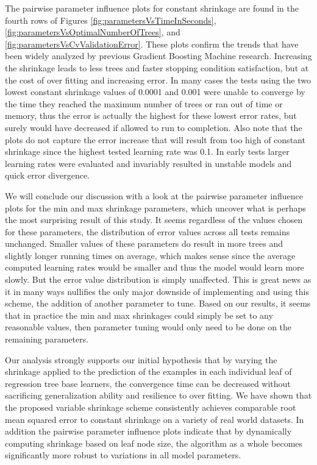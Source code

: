 \documentclass[9pt, conference]{IEEEtran}
\begin{document}
The pairwise parameter influence plots for constant shrinkage are found in the fourth rows of Figures \ref{fig:parametersVsTimeInSeconds},
\ref{fig:parametersVsOptimalNumberOfTrees}, and
\ref{fig:parametersVsCvValidationError}. These plots confirm the trends that have been widely analyzed by previous Gradient Boosting Machine research. Increasing the shrinkage leads to less trees and faster stopping condition satisfaction, but at the cost of over fitting and increasing error. In many cases the tests using the two lowest constant shrinkage values of 0.0001 and 0.001 were unable to converge by the time they reached the maximum number of trees or ran out of time or memory, thus the error is actually the highest for these lowest error rates, but surely would have decreased if allowed to run to completion. Also note that the plots do not capture the error increase that will result from too high of constant shrinkage since the highest tested learning rate was 0.1. In early tests larger learning rates were evaluated and invariably resulted in unstable models and quick error divergence.

We will conclude our discussion with a look at the pairwise parameter influence plots for the min and max shrinkage parameters, which uncover what is perhaps the most surprising result of this study. It seems regardless of the values chosen for these parameters, the distribution of error values across all tests remains unchanged. Smaller values of these parameters do result in more trees and slightly longer running times on average, which makes sense since the average computed learning rates would be smaller and thus the model would learn more slowly. But the error value distribution is simply unaffected. This is great news as it in many ways nullifies the only major downside of implementing and using this scheme, the addition of another parameter to tune. Based on our results, it seems that in practice the min and max shrinkages could simply be set to any reasonable values, then parameter tuning would only need to be done on the remaining parameters. 

Our analysis strongly supports our initial hypothesis that by varying the shrinkage applied to the prediction of the examples in each individual leaf of regression tree base learners, the convergence time can be decreased without sacrificing generalization ability and resilience to over fitting. We have shown that the proposed variable shrinkage scheme consistently achieves comparable root mean squared error to constant shrinkage on a variety of real world datasets. In addition the pairwise parameter influence plots indicate that by dynamically computing shrinkage based on leaf node size, the algorithm as a whole becomes significantly more robust to variations in all model parameters. 
\end{document}
